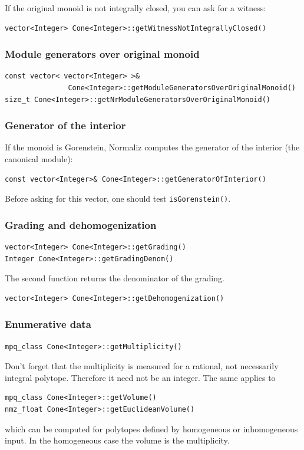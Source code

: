 \begin{small}
If the original monoid is not integrally closed, you can ask for a witness:
\begin{Verbatim}
vector<Integer> Cone<Integer>::getWitnessNotIntegrallyClosed()
\end{Verbatim}

\subsubsection{Module generators over original monoid}

\begin{Verbatim}
const vector< vector<Integer> >& 
               Cone<Integer>::getModuleGeneratorsOverOriginalMonoid()
size_t Cone<Integer>::getNrModuleGeneratorsOverOriginalMonoid()
\end{Verbatim}

\subsubsection{Generator of the interior}\label{GenInt}

If the monoid is Gorenstein, Normaliz computes the generator of the interior (the canonical module):
\begin{Verbatim}
const vector<Integer>& Cone<Integer>::getGeneratorOfInterior()
\end{Verbatim}
Before asking for this vector, one should test \verb|isGorenstein()|.

\subsubsection{Grading and dehomogenization}

\begin{Verbatim}
vector<Integer> Cone<Integer>::getGrading()
Integer Cone<Integer>::getGradingDenom()
\end{Verbatim}
The second function returns the denominator of the grading.

\begin{Verbatim}
vector<Integer> Cone<Integer>::getDehomogenization()
\end{Verbatim}

\subsubsection{Enumerative data}

\begin{Verbatim}
mpq_class Cone<Integer>::getMultiplicity()
\end{Verbatim}
Don't forget that the multiplicity is measured for a rational, not necessarily integral polytope. Therefore it need not be an integer. The same applies to
\begin{Verbatim}
mpq_class Cone<Integer>::getVolume()
nmz_float Cone<Integer>::getEuclideanVolume()
\end{Verbatim}
which can be computed for polytopes defined by homogeneous or inhomogeneous input. In the homogeneous case the volume is the multiplicity.


\end{small}
